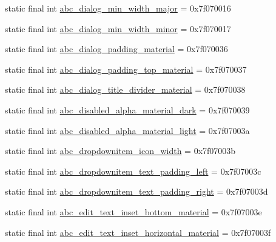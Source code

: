 \begin{CompactItemize}
\item 
static final int \hyperlink{classandroid_1_1support_1_1fragment_1_1_r_1_1dimen_fd8ad81b06e2878a733df90a1a6609ab}{abc\_\-dialog\_\-min\_\-width\_\-major} = 0x7f070016
\item 
static final int \hyperlink{classandroid_1_1support_1_1fragment_1_1_r_1_1dimen_abe71f8ba7f556bede9d35b819e0cbd6}{abc\_\-dialog\_\-min\_\-width\_\-minor} = 0x7f070017
\item 
static final int \hyperlink{classandroid_1_1support_1_1fragment_1_1_r_1_1dimen_4137861a9186d19acb1dc38cb0284567}{abc\_\-dialog\_\-padding\_\-material} = 0x7f070036
\item 
static final int \hyperlink{classandroid_1_1support_1_1fragment_1_1_r_1_1dimen_e4b2b7df8d5acd1651806360fc170e2f}{abc\_\-dialog\_\-padding\_\-top\_\-material} = 0x7f070037
\item 
static final int \hyperlink{classandroid_1_1support_1_1fragment_1_1_r_1_1dimen_22a5a6fb3cbbd031d6fa3ae0e46bb106}{abc\_\-dialog\_\-title\_\-divider\_\-material} = 0x7f070038
\item 
static final int \hyperlink{classandroid_1_1support_1_1fragment_1_1_r_1_1dimen_09e7bafbafe090cbd7e5fbe02f080aa2}{abc\_\-disabled\_\-alpha\_\-material\_\-dark} = 0x7f070039
\item 
static final int \hyperlink{classandroid_1_1support_1_1fragment_1_1_r_1_1dimen_7cdd8f96b92abe556724bb32dacc6373}{abc\_\-disabled\_\-alpha\_\-material\_\-light} = 0x7f07003a
\item 
static final int \hyperlink{classandroid_1_1support_1_1fragment_1_1_r_1_1dimen_d6e7201615218b797ab3799067c13d56}{abc\_\-dropdownitem\_\-icon\_\-width} = 0x7f07003b
\item 
static final int \hyperlink{classandroid_1_1support_1_1fragment_1_1_r_1_1dimen_f0667a1b905ce3a8322175f52b7c2be7}{abc\_\-dropdownitem\_\-text\_\-padding\_\-left} = 0x7f07003c
\item 
static final int \hyperlink{classandroid_1_1support_1_1fragment_1_1_r_1_1dimen_613f6a4941a2520e93a052ec1c815d98}{abc\_\-dropdownitem\_\-text\_\-padding\_\-right} = 0x7f07003d
\item 
static final int \hyperlink{classandroid_1_1support_1_1fragment_1_1_r_1_1dimen_da8cff916278312d40068618ebd1ff1e}{abc\_\-edit\_\-text\_\-inset\_\-bottom\_\-material} = 0x7f07003e
\item 
static final int \hyperlink{classandroid_1_1support_1_1fragment_1_1_r_1_1dimen_fd59b3df814448ab47640065b3cf1d19}{abc\_\-edit\_\-text\_\-inset\_\-horizontal\_\-material} = 0x7f07003f

\end{CompactItemize}
